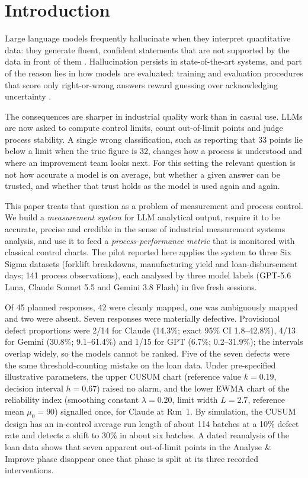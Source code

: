 \documentclass[11pt]{article}
\begin{document}
\section{Introduction}
Large language models frequently hallucinate when they interpret quantitative data: they generate fluent, confident statements that are not supported by the data in front of them \citep{ji2023hallucination,huang2025survey}. Hallucination persists in state-of-the-art systems, and part of the reason lies in how models are evaluated: training and evaluation procedures that score only right-or-wrong answers reward guessing over acknowledging uncertainty \citep{kalai2025why}.

The consequences are sharper in industrial quality work than in casual use. LLMs are now asked to compute control limits, count out-of-limit points and judge process stability. A single wrong classification, such as reporting that 33 points lie below a limit when the true figure is 32, changes how a process is understood and where an improvement team looks next. For this setting the relevant question is not how accurate a model is on average, but whether a given answer can be trusted, and whether that trust holds as the model is used again and again.

This paper treats that question as a problem of measurement and process control. We build a \emph{measurement system} for LLM analytical output, require it to be accurate, precise and credible in the sense of industrial measurement systems analysis, and use it to feed a \emph{process-performance metric} that is monitored with classical control charts. The pilot reported here applies the system to three Six Sigma datasets (forklift breakdowns, manufacturing yield and loan-disbursement days; 141 process observations), each analysed by three model labels (GPT-5.6 Luna, Claude Sonnet 5.5 and Gemini 3.8 Flash) in five fresh sessions.

Of 45 planned responses, 42 were cleanly mapped, one was ambiguously mapped and two were absent. Seven responses were materially defective. Provisional defect proportions were 2/14 for Claude (14.3\%; exact 95\% CI 1.8--42.8\%), 4/13 for Gemini (30.8\%; 9.1--61.4\%) and 1/15 for GPT (6.7\%; 0.2--31.9\%); the intervals overlap widely, so the models cannot be ranked. Five of the seven defects were the same threshold-counting mistake on the loan data. Under pre-specified illustrative parameters, the upper CUSUM chart (reference value $k=0.19$, decision interval $h=0.67$) raised no alarm, and the lower EWMA chart of the reliability index (smoothing constant $\lambda=0.20$, limit width $L=2.7$, reference mean $\mu_0=90$) signalled once, for Claude at Run~1. By simulation, the CUSUM design has an in-control average run length of about 114 batches at a 10\% defect rate and detects a shift to 30\% in about six batches. A dated reanalysis of the loan data shows that seven apparent out-of-limit points in the Analyse \& Improve phase disappear once that phase is split at its three recorded interventions.
\end{document}
